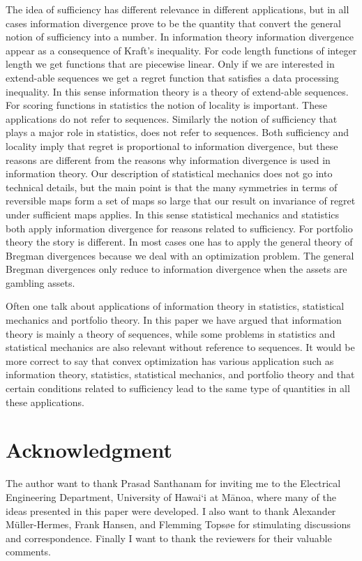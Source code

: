 \documentclass[10pt,a4paper,draft]{article}
\begin{document}
The idea of sufficiency has different
relevance in different applications, but in all cases
information divergence prove to be the quantity that convert the general
notion of sufficiency into a number. In information theory information
divergence appear as a consequence of Kraft's inequality. For
code length functions of
integer length we get functions that are piecewise linear. Only
if we are interested in extend-able sequences we get a regret
function that satisfies a
data processing inequality. In this sense information theory is
a theory of extend-able sequences. For scoring functions in
statistics the notion of
locality is important. These applications do not refer to
sequences. Similarly the notion of sufficiency that plays a major
role in statistics, does not
refer to sequences. Both sufficiency and locality imply that
regret is proportional to information divergence, but these
reasons are different from the
reasons why information divergence is used in information
theory. Our description of statistical mechanics does not go
into technical details, but
the main point is that the many symmetries in terms of
reversible maps form a set of maps so
large that our result on invariance
of regret under sufficient maps applies. In this sense
statistical mechanics and statistics both apply information
divergence for reasons
related to sufficiency. For portfolio theory the story is
different. In most cases one has to apply the general theory of
Bregman divergences because we
deal with an optimization problem. The general Bregman
divergences only reduce to information divergence when the
assets are gambling assets.

Often one talk about applications of information theory in
statistics, statistical mechanics and portfolio theory. In this
paper we have argued that
information theory is mainly a theory of sequences, while some
problems in statistics and statistical mechanics are also
relevant without reference to
sequences. It would be more correct
to say that convex optimization has various application such as 
information theory, statistics,
statistical mechanics, and portfolio theory and that certain
conditions related to sufficiency lead to the same type of
quantities in all these applications.

\section*{Acknowledgment}

The author want to thank Prasad Santhanam for inviting me to the
Electrical Engineering Department, University of Hawai\textquoteleft i at
M\={a}noa, where many of the ideas presented in this paper were developed.
I also want to thank Alexander M{\"u}ller-Hermes, Frank Hansen, and Flemming Tops{\o}e
for stimulating discussions and correspondence.
Finally I want to thank the reviewers for their valuable
comments.
\end{document}
